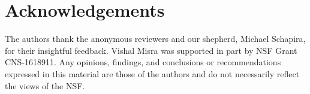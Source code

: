 \section{Acknowledgements}

The authors thank the anonymous reviewers and our shepherd, Michael Schapira, for their insightful feedback. 
Vishal Misra was supported in part by NSF Grant CNS-1618911. Any opinions, 
findings, and conclusions or recommendations expressed in this material 
are those of the authors and do not necessarily reflect the views of the NSF.